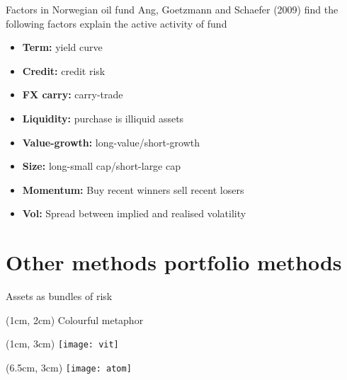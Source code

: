 \documentclass[14pt,xcolor=pdftex,dvipsnames,table]{beamer}\usepackage[]{graphicx}\usepackage[]{color}
\begin{document}
\begin{frame}{Factors in Norwegian oil fund}
Ang, Goetzmann and Schaefer (2009) find the following factors explain the active activity of fund
\begin{itemize}[<+-| alert@+>]
\pause
\item \textbf{Term:} yield curve 
\item \textbf{Credit:} credit risk
\item \textbf{FX carry:} carry-trade
\item \textbf{Liquidity:} purchase is illiquid assets
\item \textbf{Value-growth:} long-value/short-growth
\item \textbf{Size:} long-small cap/short-large cap
\item \textbf{Momentum:} Buy recent winners sell recent losers
\item \textbf{Vol:} Spread between implied and realised volatility
\end{itemize}
\end{frame}
\section{Other methods portfolio methods}
\begin{frame}{Assets as bundles of risk}
\begin{textblock*}{5cm}(1cm, 2cm)
Colourful metaphor
\end{textblock*}
\begin{textblock*}{5.2cm}(1cm, 3cm) %
\texttt{[image: vit]}
\end{textblock*}
\begin{textblock*}{5.2cm}(6.5cm, 3cm)
\texttt{[image: atom]}
\end{textblock*}
\end{frame}
\end{document}
